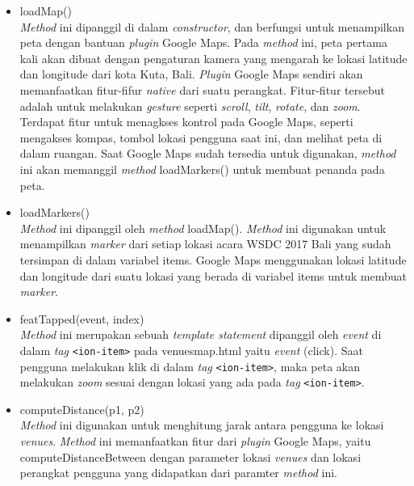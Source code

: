 \begin{enumerate}
\begin{enumerate}
\begin{itemize}
		\item loadMap() \\
		\textit{Method} ini dipanggil di dalam \textit{constructor}, dan berfungsi untuk menampilkan peta dengan bantuan \textit{plugin} Google Maps. Pada \textit{method} ini, peta pertama kali akan dibuat dengan pengaturan kamera yang mengarah ke lokasi latitude dan longitude dari kota Kuta, Bali. 	
		\textit{Plugin} Google Maps sendiri akan memanfaatkan fitur-fifur \textit{native} dari suatu perangkat. Fitur-fitur tersebut adalah untuk melakukan \textit{gesture} seperti \textit{scroll}, \textit{tilt}, \textit{rotate}, dan \textit{zoom}. Terdapat fitur untuk menagkses kontrol pada Google Maps, seperti mengakses kompas, tombol lokasi pengguna saat ini, dan melihat peta di dalam ruangan. Saat Google Maps sudah tersedia untuk digunakan, \textit{method} ini akan memanggil \textit{method} loadMarkers() untuk membuat penanda pada peta.	
		\item loadMarkers() \\
		\textit{Method} ini dipanggil oleh \textit{method} loadMap(). \textit{Method} ini digunakan untuk menampilkan \textit{marker} dari setiap lokasi acara WSDC 2017 Bali yang sudah tersimpan di dalam variabel items. Google Maps menggunakan lokasi latitude dan longitude dari suatu lokasi yang berada di variabel items untuk membuat \textit{marker}.  
		\item featTapped(event, index) \\
		\textit{Method} ini merupakan sebuah \textit{template statement} dipanggil oleh \textit{event} di dalam \textit{tag} \texttt{<ion-item>} pada venues\textunderscore map.html yaitu \textit{event} (click). Saat pengguna melakukan klik di dalam \textit{tag} \texttt{<ion-item>}, maka peta akan melakukan \textit{zoom} sesuai dengan lokasi yang ada pada \textit{tag} \texttt{<ion-item>}.
		\item computeDistance(p1, p2)\\
		\textit{Method} ini digunakan untuk menghitung jarak antara pengguna ke lokasi \textit{venues}. \textit{Method} ini memanfaatkan fitur dari \textit{plugin} Google Maps, yaitu computeDistanceBetween dengan parameter lokasi \textit{venues} dan lokasi perangkat pengguna yang didapatkan dari paramter \textit{method} ini.
	\end{itemize}
	

\end{enumerate}
\end{enumerate}
